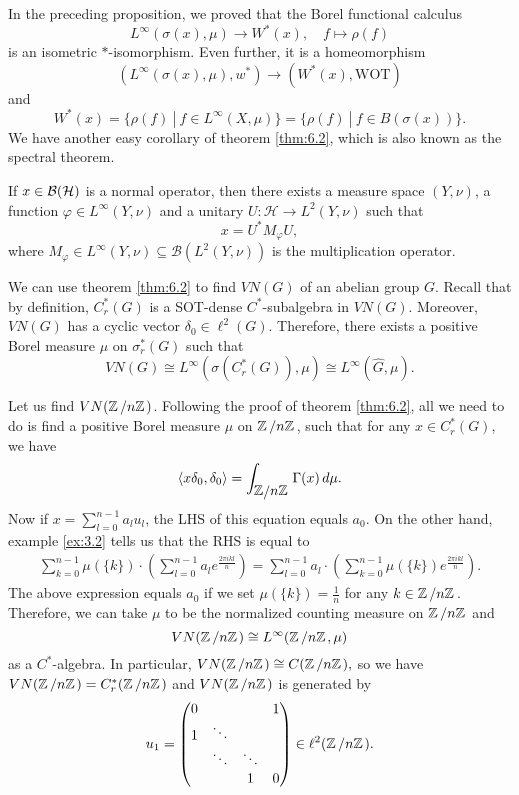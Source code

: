 In the preceding proposition, we proved that the Borel functional calculus
$$L^\infty(\sigma(x), \mu) \to W^* (x),\quad f \mapsto \rho (f)$$
is an isometric $*$-isomorphism. Even further, it is a homeomorphism 
$$(L^\infty (\sigma(x), \mu), w^*) \to (W^* (x), \textrm{WOT})$$
and $$W^* (x) = \{\rho (f)\ |\ f \in L^\infty (X, \mu)\} = \{\rho (f)\ |\ f \in B(\sigma(x))\}.$$
We have another easy corollary of theorem \ref{thm:6.2}, which is also known as the spectral theorem.

\begin{theorem}
  If $x \in \operatorname{\mathcal{B} (\mathcal{H})}$ is a normal operator, then there exists a measure space $(Y, \nu)$, a function $\varphi \in L^\infty (Y, \nu)$
  and a unitary $U: \mathcal{H} \to L^2(Y, \nu)$ such that 
  $$x = U^* M_{\varphi} U,$$
  where $M_{\varphi} \in L^\infty (Y, \nu) \subseteq \mathcal{B}(L^2 (Y, \nu))$
  is the multiplication operator.
\end{theorem}

We can use theorem \ref{thm:6.2} to find $VN(G)$ of an abelian group $G$.
Recall that by definition, $C_r ^* (G)$ is a SOT-dense $C^*$-subalgebra in $VN(G)$.
Moreover, $VN(G)$ has a cyclic vector $\delta_0 \in \ell^2 (G)$.
Therefore, there exists a positive Borel measure $\mu$ on $\sigma_r ^* (G)$ such that $$VN(G) \cong L^\infty (\sigma (C_r ^* (G)), \mu) \cong L^\infty (\widehat{G}, \mu).$$

\begin{example}
  Let us find $VN(\quot{\Z}{n\Z})$.
  Following the proof of theorem \ref{thm:6.2}, all we need to do is find a positive Borel measure $\mu$ on $\quot{\Z}{n\Z}$, such that for any $x \in C_r ^* (G)$, we have
  $$\langle x \delta_0, \delta_0 \rangle = \int_{\quot{\mathbb{Z}}{n\mathbb{Z}}} \Gamma (x)\, d\mu.$$
  Now if $x = \sum_{l = 0} ^{n - 1} a_l u_l$, the LHS of this equation equals $a_0$.
  On the other hand, example \ref{ex:3.2} tells us that the RHS is equal to 
  \begin{align*}
    \sum_{k = 0} ^{n - 1} \mu (\{k\}) \cdot \left(\sum_{l = 0} ^{n - 1} a_l e^{\frac{2 \pi i k l}{n}}\right) = \sum_{l = 0} ^{n - 1} a_l \cdot \left(\sum_{k = 0} ^{n - 1} \mu (\{k\})  e^{\frac{2 \pi i k l}{n}}\right).
  \end{align*}
  The above expression equals $a_0$ if we set $\mu (\{k\}) = \frac{1}{n}$ for any $k \in \quot{\Z}{n\Z}$.
  Therefore, we can take $\mu$ to be the normalized counting measure on $\quot{\Z}{n\Z}$ and 
  $$VN(\quot{\Z}{n\Z}) \cong L^\infty (\quot{\Z}{n\Z}, \mu)$$
  as a $C^*$-algebra. In particular, $VN(\quot{\Z}{n\Z}) \cong C(\quot{\Z}{n\Z}),$
  so we have $VN(\quot{\Z}{n\Z}) = C_r ^* (\quot{\Z}{n\Z})$ and $VN(\quot{\Z}{n\Z})$ is generated by 
  $$u_1 = \begin{pmatrix}
    0 &  & & 1\\
    1 & \ddots && \\
      & \ddots & \ddots & \\
     & & 1 & 0
  \end{pmatrix} \in \ell^2 (\quot{\Z}{n\Z}).$$
\end{example}

